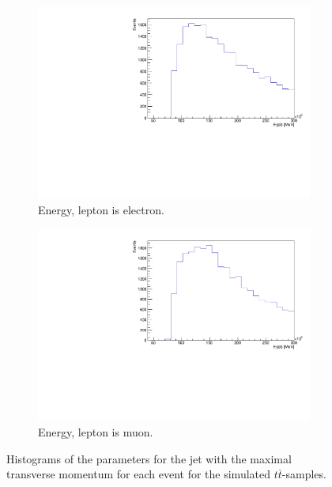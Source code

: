 \begin{figure}[H]
  \begin{subfigure}{0.45\textwidth}%
    \centering%
    \includegraphics[width=\textwidth]{plots/ttbar_distributions/ttbar.el_jet_E_max.pdf}%
    \caption{Energy, lepton is electron.}%
    \label{fig:4g}%
  \end{subfigure}%
  \hfill
  \begin{subfigure}{0.45\textwidth}%
    \centering%
    \includegraphics[width=\textwidth]{plots/ttbar_distributions/ttbar.mu_jet_E_max.pdf}%
    \caption{Energy, lepton is muon.}%
    \label{fig:4h}%
  \end{subfigure}%
  \caption{Histograms of the parameters for the jet with the maximal transverse momentum for each event for the simulated $t \overline{t}$-samples.}%
  \label{fig:4}%
\end{figure}

